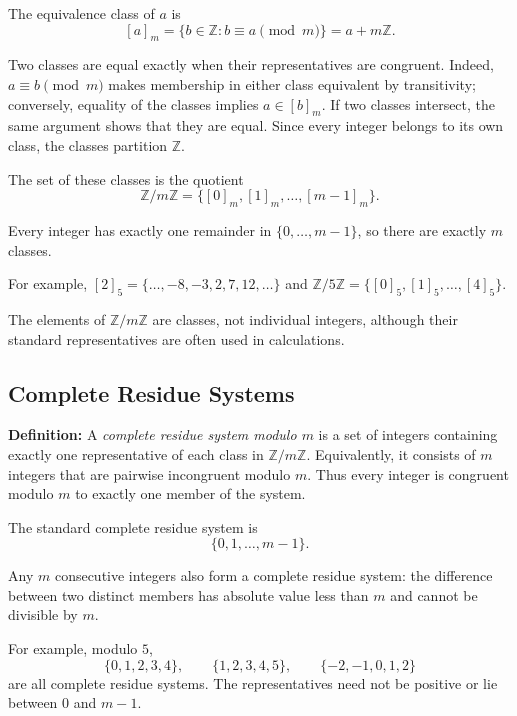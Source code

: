 \documentclass[a4paper,11pt,abstracton]{scrartcl}
\theoremstyle{dotlessP}
\theoremstyle{dotlessS}
\theoremstyle{remark}
\theoremstyle{definition}
\begin{document}
\begin{definition_box}
The equivalence class of $a$ is
\[
    [a]_m=\{b\in\mathbb{Z}:b\equiv a\pmod m\}
          =a+m\mathbb{Z}.
\]
\end{definition_box}

Two classes are equal exactly when their representatives are congruent.
Indeed, $a\equiv b\pmod m$ makes membership in either class equivalent
by transitivity; conversely, equality of the classes implies
$a\in[b]_m$. If two classes intersect, the same argument shows that
they are equal. Since every integer belongs to its own class, the
classes partition $\mathbb{Z}$.


\begin{definition_box}
The set of these classes is the quotient
\[
    \mathbb{Z}/m\mathbb{Z}
    =\{[0]_m,[1]_m,\ldots,[m-1]_m\}.
\]
\end{definition_box}

Every integer has exactly one remainder in $\{0,\ldots,m-1\}$, so
there are exactly $m$ classes.
\begin{example_box}
For example,
$[2]_5=\{\ldots,-8,-3,2,7,12,\ldots\}$ and $\mathbb{Z}/5\mathbb{Z}
    =\{[0]_5,[1]_5,\ldots,[4]_5\}$.
\end{example_box}

The elements of $\mathbb{Z}/m\mathbb{Z}$ are classes, not individual
integers, although their standard representatives are often used in
calculations.

\subsection{Complete Residue Systems}


\begin{definition_box}
\textbf{Definition:}
A \emph{complete residue system modulo $m$} is a set of integers
containing exactly one representative of each class in
$\mathbb{Z}/m\mathbb{Z}$. Equivalently, it consists of $m$ integers
that are pairwise incongruent modulo $m$.
Thus every integer is congruent modulo $m$ to exactly one member of
the system.

The standard complete residue system is
\[
    \{0,1,\ldots,m-1\}.
\]
\end{definition_box}

Any $m$ consecutive integers also form a complete residue system:
the difference between two distinct members has absolute value less
than $m$ and cannot be divisible by $m$.
\begin{example_box}
For example, modulo $5$,
\[
    \{0,1,2,3,4\},\qquad \{1,2,3,4,5\},\qquad \{-2,-1,0,1,2\}
\]
are all complete residue systems. The representatives need not be
positive or lie between $0$ and $m-1$.
\end{example_box}
\end{document}
